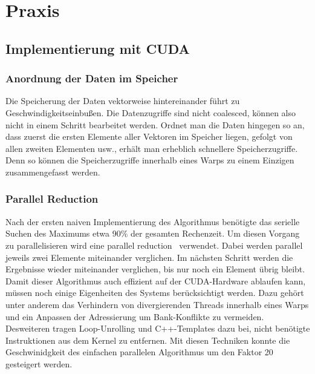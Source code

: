 \documentclass[ngerman]{scrartcl}
\begin{document}
\clearpage
\section{Praxis}
\subsection{Implementierung mit CUDA}
\subsubsection{Anordnung der Daten im Speicher}
Die Speicherung der Daten vektorweise hintereinander führt zu Geschwindigkeitseinbußen. 
Die Datenzugriffe sind nicht coalesced, können also nicht in einem Schritt 
bearbeitet werden.
Ordnet man die Daten hingegen so an, dass zuerst die ersten Elemente aller Vektoren im Speicher liegen, gefolgt von allen zweiten Elementen usw., erhält man erheblich schnellere Speicherzugriffe.
Denn so können die Speicherzugriffe innerhalb eines Warps zu einem Einzigen zusammengefasst werden.

\subsubsection{Parallel Reduction}
Nach der ersten naiven Implementierung des Algorithmus benötigte das serielle Suchen des Maximums etwa 90\% der gesamten Rechenzeit. %
Um diesen Vorgang zu parallelisieren wird eine parallel reduction~\cite{parallelreduction} verwendet.
Dabei werden parallel jeweils zwei Elemente miteinander verglichen.
Im nächsten Schritt werden die Ergebnisse wieder miteinander verglichen, bis nur noch ein Element übrig bleibt.
Damit dieser Algorithmus auch effizient auf der CUDA-Hardware ablaufen kann, müssen noch einige Eigenheiten des Systems berücksichtigt werden.
Dazu gehört unter anderem das Verhindern von divergierenden Threads innerhalb eines Warps und ein Anpassen der Adressierung um Bank-Konflikte zu vermeiden.
Desweiteren tragen Loop-Unrolling und C++-Templates dazu bei, nicht benötigte Instruktionen aus dem Kernel zu entfernen.
Mit diesen Techniken konnte die Geschwinidgkeit des einfachen parallelen Algorithmus um den Faktor 20 gesteigert werden.
\end{document}
